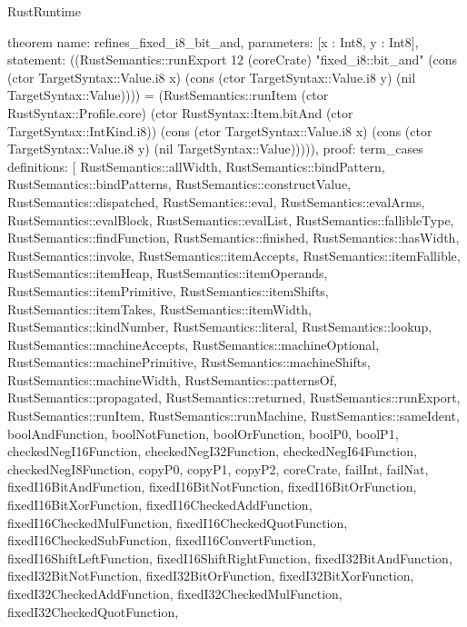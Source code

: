 \begin{lexlean}{RustRuntime}
\begin{semanticmodule}
theorem{
  name: refines_fixed_i8_bit_and,
  parameters: [x : Int8, y : Int8],
  statement: ((RustSemantics::runExport 12 (coreCrate) "fixed_i8::bit_and" (cons (ctor TargetSyntax::Value.i8 x) (cons (ctor TargetSyntax::Value.i8 y) (nil TargetSyntax::Value)))) = (RustSemantics::runItem (ctor RustSyntax::Profile.core) (ctor RustSyntax::Item.bitAnd (ctor TargetSyntax::IntKind.i8)) (cons (ctor TargetSyntax::Value.i8 x) (cons (ctor TargetSyntax::Value.i8 y) (nil TargetSyntax::Value))))),
  proof: term_cases{
    definitions: [
      RustSemantics::allWidth,
      RustSemantics::bindPattern,
      RustSemantics::bindPatterns,
      RustSemantics::constructValue,
      RustSemantics::dispatched,
      RustSemantics::eval,
      RustSemantics::evalArms,
      RustSemantics::evalBlock,
      RustSemantics::evalList,
      RustSemantics::fallibleType,
      RustSemantics::findFunction,
      RustSemantics::finished,
      RustSemantics::hasWidth,
      RustSemantics::invoke,
      RustSemantics::itemAccepts,
      RustSemantics::itemFallible,
      RustSemantics::itemHeap,
      RustSemantics::itemOperands,
      RustSemantics::itemPrimitive,
      RustSemantics::itemShifts,
      RustSemantics::itemTakes,
      RustSemantics::itemWidth,
      RustSemantics::kindNumber,
      RustSemantics::literal,
      RustSemantics::lookup,
      RustSemantics::machineAccepts,
      RustSemantics::machineOptional,
      RustSemantics::machinePrimitive,
      RustSemantics::machineShifts,
      RustSemantics::machineWidth,
      RustSemantics::patternsOf,
      RustSemantics::propagated,
      RustSemantics::returned,
      RustSemantics::runExport,
      RustSemantics::runItem,
      RustSemantics::runMachine,
      RustSemantics::sameIdent,
      boolAndFunction,
      boolNotFunction,
      boolOrFunction,
      boolP0,
      boolP1,
      checkedNegI16Function,
      checkedNegI32Function,
      checkedNegI64Function,
      checkedNegI8Function,
      copyP0,
      copyP1,
      copyP2,
      coreCrate,
      failInt,
      failNat,
      fixedI16BitAndFunction,
      fixedI16BitNotFunction,
      fixedI16BitOrFunction,
      fixedI16BitXorFunction,
      fixedI16CheckedAddFunction,
      fixedI16CheckedMulFunction,
      fixedI16CheckedQuotFunction,
      fixedI16CheckedSubFunction,
      fixedI16ConvertFunction,
      fixedI16ShiftLeftFunction,
      fixedI16ShiftRightFunction,
      fixedI32BitAndFunction,
      fixedI32BitNotFunction,
      fixedI32BitOrFunction,
      fixedI32BitXorFunction,
      fixedI32CheckedAddFunction,
      fixedI32CheckedMulFunction,
      fixedI32CheckedQuotFunction,
}}
\end{semanticmodule}
\end{lexlean}
